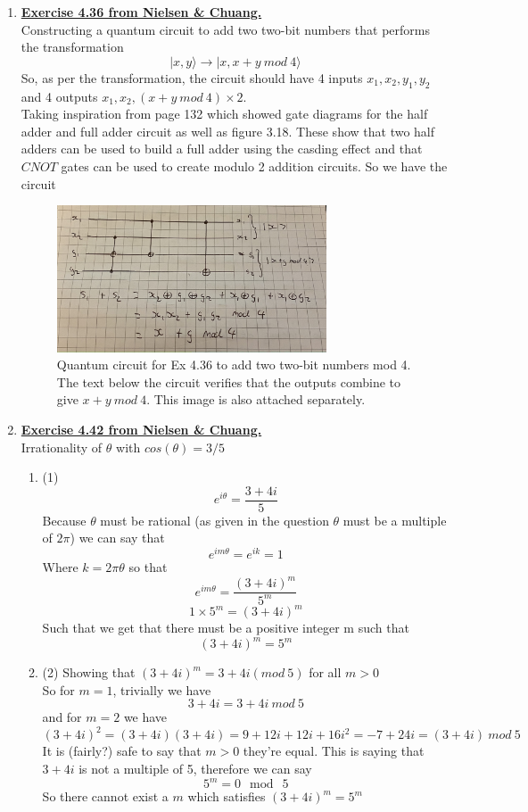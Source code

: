 \documentclass[12pt]{article}
\newcommand{\ket}[1]{\vert{#1}\rangle}
\begin{document}
\begin{enumerate}
\pagebreak


\item \textbf{\underline{Exercise 4.36 from Nielsen \& Chuang.}}
\\
Constructing a quantum circuit to add two two-bit numbers that performs the transformation 
$$ \ket{x,y} \rightarrow \ket{x,x+y \ mod \ 4} $$
So, as per the transformation, the circuit should have 4 inputs $x_1, x_2, y_1, y_2$ and 4 outputs $x_1, x_2, (x+y \ mod \ 4) \times 2$. 
\\
Taking inspiration from page 132 which showed gate diagrams for the half adder and full adder circuit as well as figure 3.18. These show that two half adders can be used to build a full adder using the casding effect and that $CNOT$ gates can be used to create modulo 2 addition circuits. 
So we have the circuit 
\begin{figure}[h!]
    
    \includegraphics[width=8cm]{436.jpg}
    \centering
    \caption{Quantum circuit for Ex 4.36 to add two two-bit numbers mod 4. The text below the circuit verifies that the outputs combine to give $x+y \ mod \ 4$. This image is also attached separately.}
\end{figure}

\item \textbf{\underline{Exercise 4.42 from Nielsen \& Chuang.}} 
\\
Irrationality of $\theta$ with $cos(\theta) = 3/5$ 
\begin{enumerate}
    \item (1) 
    \\
    $$ e^{i \theta} = \frac{3+4i}{5} $$
    Because $\theta$ must be rational (as given in the question $\theta$ must be a multiple of $2\pi$) we can say that 
    $$ e^{im \theta} = e^{ik} = 1 $$
    Where $k= 2 \pi \theta$ so that 
    $$ e^{i m \theta} = \frac{(3+4i)^m}{5^m}$$
    $$ 1 \times 5^m = (3+4i)^m $$
    Such that we get that there must be a positive integer m such that 
    $$ (3 +4i)^m = 5^m$$ 

    \item (2) Showing that $(3+4i)^m = 3+4i (mod \ 5) $ for all $m > 0$ 
    \\
    So for $m=1$, trivially we have 
    $$ 3+4i = 3+4i \ mod \ 5 $$ 
    and for $m=2$ we have 
    $$ (3+4i)^2 = (3+4i)(3+4i) = 9 +12i +12i +16i^2 = -7 +24i = (3+4i) \ mod \ 5 $$ 
    It is (fairly?) safe to say that $m >0$ they're equal. This is saying that $3+4i$ is not a multiple of 5, therefore we can say 
    $$ 5^m = 0 \mod \ 5 $$ 
    So there cannot exist a $m$ which satisfies $(3+4i)^m = 5^m$
\end{enumerate}



\end{enumerate}
\end{document}

